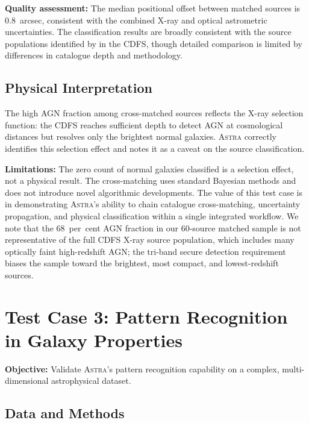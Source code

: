\documentclass[usenatbib]{rasti}
\newcommand{\astra}{\textsc{Astra}\xspace}
\begin{document}
\textbf{Quality assessment:}
The median positional offset between matched sources is 0.8~arcsec, consistent with the combined X-ray and optical astrometric uncertainties.
The classification results are broadly consistent with the source populations identified by \citet{Bauer2004} in the CDFS, though detailed comparison is limited by differences in catalogue depth and methodology.

\subsection{Physical Interpretation}
\label{sec:tc2:interpretation}

The high AGN fraction among cross-matched sources reflects the X-ray selection function: the CDFS reaches sufficient depth to detect AGN at cosmological distances but resolves only the brightest normal galaxies.
\astra correctly identifies this selection effect and notes it as a caveat on the source classification.

\textbf{Limitations:} The zero count of normal galaxies classified is a selection effect, not a physical result.
The cross-matching uses standard Bayesian methods and does not introduce novel algorithmic developments.
The value of this test case is in demonstrating \astra's ability to chain catalogue cross-matching, uncertainty propagation, and physical classification within a single integrated workflow.
We note that the 68~per~cent AGN fraction in our 60-source matched sample is not representative of the full CDFS X-ray source population, which includes many optically faint high-redshift AGN; the tri-band secure detection requirement biases the sample toward the brightest, most compact, and lowest-redshift sources.

\section{Test Case 3: Pattern Recognition in Galaxy Properties}
\label{sec:tc3}

\textbf{Objective:} Validate \astra's pattern recognition capability on a complex, multi-dimensional astrophysical dataset.

\subsection{Data and Methods}
\label{sec:tc3:data}
\end{document}
